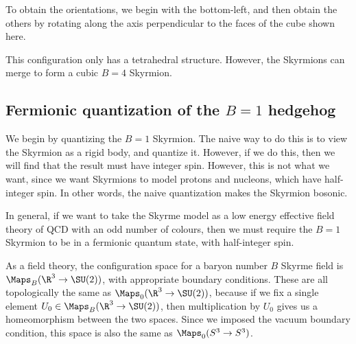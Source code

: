 \documentclass[a4paper]{article}
\begin{document}
\begin{center}
\end{center}
To obtain the orientations, we begin with the bottom-left, and then obtain the others by rotating along the axis perpendicular to the faces of the cube shown here.

This configuration only has a tetrahedral structure. However, the Skyrmions can merge to form a cubic $B = 4$ Skyrmion.

\subsection{Fermionic quantization of the \texorpdfstring{$B = 1$}{B = 1} hedgehog}
We begin by quantizing the $B = 1$ Skyrmion. The naive way to do this is to view the Skyrmion as a rigid body, and quantize it. However, if we do this, then we will find that the result must have integer spin. However, this is not what we want, since we want Skyrmions to model protons and nucleons, which have half-integer spin. In other words, the naive quantization makes the Skyrmion bosonic.

In general, if we want to take the Skyrme model as a low energy effective field theory of QCD with an odd number of colours, then we must require the $B = 1$ Skyrmion to be in a fermionic quantum state, with half-integer spin.

As a field theory, the configuration space for a baryon number $B$ Skyrme field is $\Maps_B(\R^3 \to \SU(2))$, with appropriate boundary conditions. These are all topologically the same as $\Maps_0(\R^3 \to \SU(2))$, because if we fix a single element $U_0 \in \Maps_B(\R^3 \to \SU(2))$, then multiplication by $U_0$ gives us a homeomorphism between the two spaces. Since we imposed the vacuum boundary condition, this space is also the same as $\Maps_0(S^3 \to S^3)$.
\end{document}
